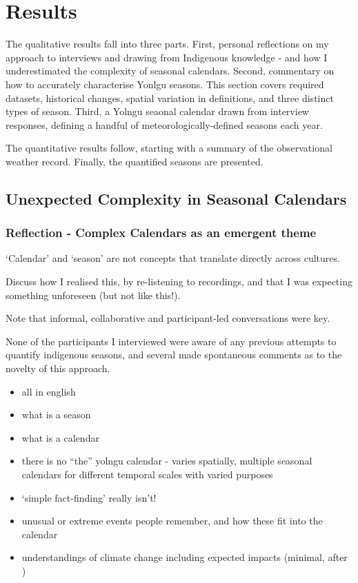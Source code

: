 \chapter{Results}
\label{ch:results}

The qualitative results fall into three parts.
%
First, personal reflections on my approach to interviews and drawing
from Indigenous knowledge - and how I underestimated the complexity
of seasonal calendars.
%
Second, commentary on how to accurately characterise Yonlgu seasons.
This section covers required datasets, historical changes, spatial
variation in definitions, and three distinct types of season.
%
Third, a Yolngu seaonal calendar drawn from interview responses,
defining a handful of meteorologically-defined seasons each year.

The quantitative results follow, starting with a summary of the
observational weather record.  Finally, the quantified seasons are
presented.



\section{Unexpected Complexity in Seasonal Calendars}
\label{sec:complex-seasons}




\subsection{Reflection - Complex Calendars as an emergent theme}

`Calendar' and `season' are not concepts that translate directly across cultures.

Discuss how I realised this, by re-listening to recordings, and that I was
expecting something unforeseen (but not like this!).

Note that informal, collaborative and participant-led conversations were key.

None of the participants I interviewed were aware of any previous
attempts to quantify indigenous seasons, and several made spontaneous
comments as to the novelty of this approach.



\begin{itemize}
\item all in english
\item what is a season
\item what is a calendar
\item there is no ``the'' yolngu calendar - varies spatially,
        multiple seasonal calendars for different temporal scales with varied purposes
\item `simple fact-finding' really isn't!
\item unusual or extreme events people remember, and how these fit into the calendar
\item understandings of climate change including expected impacts (minimal, after \citet{petheram2010})
\end{itemize}



